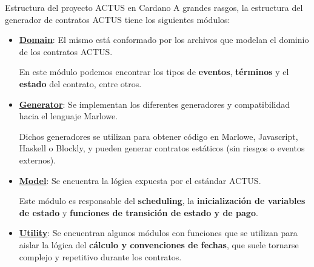 \documentclass{beamer}
\begin{document}
\begin{frame}[fragile]{Estructura del proyecto ACTUS en Cardano}
A grandes rasgos, la estructura del generador de contratos ACTUS tiene los siguientes módulos:
    \vfill
    
\begin{itemize}
    \item  \textbf{\underline{Domain}}: El mismo está conformado por los archivos que modelan el dominio de los contratos ACTUS.

        \medskip

        En este módulo podemos encontrar los tipos de \textbf{eventos}, \textbf{términos} y el \textbf{estado} del contrato, entre otros.
        \pause
        \vfill

    \item \textbf{\underline{Generator}}: Se implementan los diferentes generadores y compatibilidad hacia el lenguaje Marlowe. 

        \medskip

        Dichos generadores se utilizan para obtener código en Marlowe, Javascript, Haskell o Blockly, y pueden generar contratos estáticos (sin riesgos o eventos externos).
\end{itemize}
\end{frame}


\begin{frame}
    \begin{itemize}
        \item \textbf{\underline{Model}}: Se encuentra la lógica expuesta por el estándar ACTUS. 

            \medskip

            Este módulo es responsable del \textbf{scheduling}, la \textbf{inicialización de variables de estado} y \textbf{funciones de transición de estado y de pago}.

            \vfill
            \pause

        \item \textbf{\underline{Utility}}: Se encuentran algunos módulos con funciones que se utilizan para aislar la lógica del \textbf{cálculo y convenciones de fechas}, que suele tornarse complejo y repetitivo durante los contratos.
    \end{itemize}
\end{frame}
\end{document}
